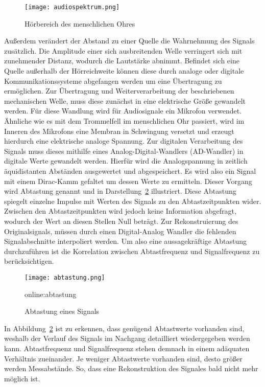 \begin{figure}[H]
	\centering
	\texttt{[image: audiospektrum.png]}
	\caption[Hörbereich des menschlichen Ohres]{Hörbereich des menschlichen Ohres} \cite{michelsSonographieOrganUnd2012}
	\label{fig:audiospektrum}
\end{figure}

Außerdem verändert der Abstand zu einer Quelle die Wahrnehmung des Signals zusätzlich. Die Amplitude einer sich ausbreitenden Welle verringert sich mit zunehmender Distanz, wodurch die Lautstärke abnimmt. Befindet sich eine Quelle außerhalb der Hörreichweite können diese durch analoge oder digitale Kommunikationssysteme abgefangen werden um eine Übertragung zu ermöglichen. Zur Übertragung und Weiterverarbeitung der beschriebenen mechanischen Welle, muss diese zunächst in eine elektrische Größe gewandelt werden. Für diese Wandlung wird für Audiosignale ein Mikrofon verwendet. Ähnliche wie es mit dem Trommelfell im menschlichen Ohr passiert, wird im Inneren des Mikrofons eine Membran in Schwingung versetzt und erzeugt hierdurch eine elektrische analoge Spannung.
Zur digitalen Verarbeitung des Signals muss dieses mithilfe eines Analog-Digital-Wandlers
(AD-Wandler) in digitale Werte gewandelt werden. Hierfür wird die Analogspannung in zeitlich äquidistanten Abständen ausgewertet und abgespeichert. Es wird also ein Signal mit einem Dirac-Kamm gefaltet um dessen Werte zu ermitteln. Dieser Vorgang wird Abtastung genannt und in Darstellung~\ref{fig:abtastung} illustriert. Diese Abtastung spiegelt einzelne Impulse mit Werten des Signals zu den Abtastzeitpunkten wider. Zwischen den Abtastzeitpunkten wird jedoch keine Information abgefragt, wodurch der Wert an diesen Stellen Null beträgt. Zur Rekonstruierung des Originalsignals, müssen durch einen Digital-Analog Wandler die fehlenden Signalabschnitte interpoliert werden. Um also eine aussagekräftige Abtastung durchzuführen ist die Korrelation zwischen Abtastfrequenz und Signalfrequenz zu berücksichtigen.


\begin{figure}[H]
	\centering
	\texttt{[image: abtastung.png]}
	\caption[Abtastung eines Signals]{Abtastung eines Signals} \gls{online:abtastung}
	\label{fig:abtastung}
\end{figure}

In Abbildung~\ref{fig:abtastung} ist zu erkennen, dass genügend Abtastwerte vorhanden sind, weshalb der Verlauf des Signals im Nachgang detailliert wiedergegeben werden kann. Abtastfrequenz und Signalfrequenz stehen demnach in einem adäquaten Verhältnis zueinander. Je weniger Abtastwerte vorhanden sind, desto größer werden Messabstände. So, dass eine Rekonstruktion des Signales bald nicht mehr möglich ist.\cite{masteraudio}

